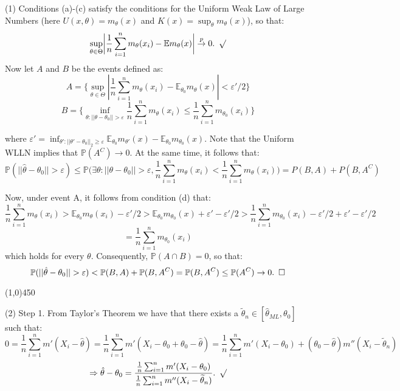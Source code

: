 \documentclass[12pt]{article}
\begin{document}

\def\ci{\perp\!\!\!\perp}
\def\ex{\mathbb{E}}
\def\prob{\mathbb{P}}
\def\ind{\mathbb{I}}
\def\grad{\triangledown}
\def\bigo{\mathcal{O}}

\noindent
(1) Conditions (a)-(c) satisfy the conditions for the Uniform Weak Law of Large Numbers (here $U(x,\theta) = m_\theta(x)$ and $K(x) = \sup_\theta m_\theta(x)$), so that:
$$\sup_{\theta\in\Theta} \biggl| \frac{1}{n} \sum_{i=1}^n m_\theta(x_i) - \ex m_\theta(x) \biggr| \overset{p}\to 0. \hspace{5 pt} \surd$$
Now let $A$ and $B$ be the events defined as:
$$A = \biggl\{ \sup_{\theta\in\Theta} | \frac{1}{n} \sum_{i=1}^n m_\theta(x_i) - \ex_{\theta_0} m_\theta(x) | < \varepsilon'/2 \biggr\}$$
$$B = \biggl\{ \inf_{\theta:||\theta-\theta_0||>\varepsilon} \frac{1}{n} \sum_{i=1}^n m_\theta(x_i) \leq \frac{1}{n} \sum_{i=1}^n m_{\theta_0}(x_i) \biggr\}$$

\noindent
where $\varepsilon' = \inf_{\theta':||\theta'-\theta_0||_2\geq \varepsilon} \ex_{\theta_0} m_{\theta'}(x) - \ex_{\theta_0} m_{\theta_0}(x)$. Note that the Uniform WLLN implies that $\prob(A^C) \to 0$. At the same time, it follows that:
$$\prob(||\hat{\theta}-\theta_0|| > \varepsilon) 
\leq \prob \biggl( \exists \theta:||\theta-\theta_0||>\varepsilon, \frac{1}{n}\sum_{i=1}^n m_\theta(x_i) < \frac{1}{n}\sum_{i=1}^n m_\theta(x_i) \biggr)
= P(B,A) + P(B,A^C)$$

\noindent
Now, under event A, it follows from condition (d) that:
$$\frac{1}{n} \sum_{i=1}^n m_\theta(x_i) > \ex_{\theta_0} m_\theta(x_i) - \varepsilon'/2
> \ex_{\theta_0} m_{\theta_0}(x)+\varepsilon'-\varepsilon'/2
> \frac{1}{n} \sum_{i=1}^n m_{\theta_0}(x_i)-\varepsilon'/2+\varepsilon'-\varepsilon'/2$$
$$= \frac{1}{n} \sum_{i=1}^n m_{\theta_0}(x_i)$$
which holds for every $\theta$. Consequently, $\prob(A \cap B) = 0$, so that:
$$\prob(||\hat{\theta}-\theta_0||>\varepsilon) < \prob(B,A) + \prob(B,A^C) = \prob(B,A^C) \leq \prob(A^C) \to 0. \hspace{5 pt} \square$$

 \begin{center}
\line(1,0){450}
\end{center}

\pagebreak
\noindent
(2) Step 1. From Taylor's Theorem we have that there exists a $\widetilde\theta_n \in [\hat{\theta}_{ML},\theta_0]$ such that:
$$0 = \frac{1}{n}\sum_{i=1}^n m'(X_i-\hat{\theta})
= \frac{1}{n}\sum_{i=1}^n m'(X_i-\theta_0+\theta_0-\hat{\theta})
= \frac{1}{n}\sum_{i=1}^n m'(X_i-\theta_0)+(\theta_0-\hat{\theta})m''(X_i-\widetilde\theta_n)$$
$$\Rightarrow \hat{\theta}-\theta_0 = \frac{\frac{1}{n}\sum_{i=1}^n m'(X_i-\theta_0)}{\frac{1}{n} \sum_{i=1}^n m''(X_i-\widetilde\theta_n)}. \hspace{5 pt} \surd$$
\end{document}
